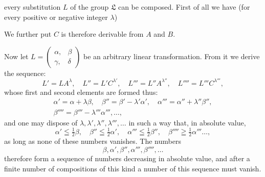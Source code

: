 every substitution $L$ of the group $\mathfrak{L}$ can be composed. First of
all we have
(for every positive or negative integer $\lambda$)

We further put
$C$ is therefore derivable from $A$ and $B$.

Now let $L = \begin{pmatrix}\alpha, & \beta\\\gamma, & \delta\end{pmatrix}$ be an arbitrary linear transformation.
From it we derive the sequence:
\[
L' = LA^\lambda, \quad L'' = L'C^{\lambda'}, \quad L''' = L''A^{\lambda''}, \quad L'''' = L'''C^{\lambda'''},
\]
whose first and second elements are formed thus:
\[
\begin{gathered}
\alpha' = \alpha + \lambda\beta, \quad \beta'' = \beta' - \lambda'\alpha', \quad \alpha''' = \alpha'' + \lambda''\beta'',\\
\beta'''' = \beta''' - \lambda'''\alpha''', \dots,
\end{gathered}
\]
and one may dispose of $\lambda, \lambda', \lambda'', \lambda''', \dots$ in such a way that, in
absolute value,
\[
\alpha' \leqq \tfrac{1}{2}\beta, \quad \beta'' \leqq \tfrac{1}{2}\alpha', \quad \alpha''' \leqq \tfrac{1}{2}\beta'', \quad \beta'''' \geqq \tfrac{1}{2}\alpha''' \dots, %
\]
as long as none of these numbers vanishes. The numbers
\[
\beta, \alpha', \beta'', \alpha''', \beta'''', \dots
\]
therefore form a sequence of numbers decreasing in absolute value, and after a finite number of compositions
of this kind a number of this sequence must vanish.

